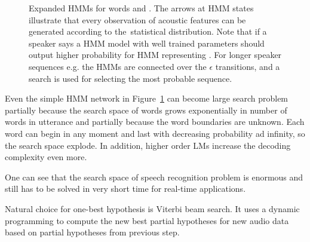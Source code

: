 \begin{figure}[!htp]
    \begin{center}
        
        \caption{Expanded \acp{HMM} for words  and . 
        The arrows at \ac{HMM} states illustrate that every observation of acoustic features 
        can be generated according to the~statistical distribution. 
        Note that if a speaker says  a \ac{HMM} model with well trained parameters should output higher probability
        for \ac{HMM} representing . For longer speaker sequences e.g.  the \acp{HMM} are connected over the 
$\epsilon$ transitions, and a search is used for selecting the most probable sequence.}
        \label{fig:hmm_alt} 
    \end{center}
\end{figure}

Even the simple \ac{HMM} network in Figure~\ref{fig:hmm_alt} can become large search problem partially because the search space of words grows exponentially in number of words in utterance and partially because the word boundaries are unknown. 
Each word can begin in any moment and last with decreasing probability ad infinity, so the search space explode.
In addition, higher order \acp{LM} increase the decoding complexity even more.

One can see that the search space of speech recognition problem is enormous and still has to be solved in very short time for real-time applications.

Natural choice for one-best hypothesis is Viterbi beam search\cite{huang2001spoken}.
It uses a dynamic programming to compute the new best partial hypotheses for new audio data based on partial hypotheses from previous step.

